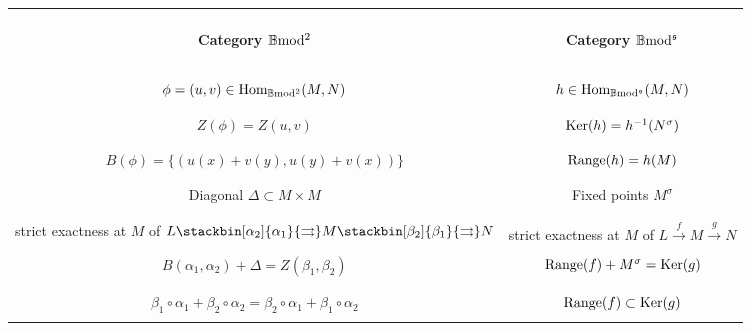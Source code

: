 \documentclass[12pt]{article}
\def\Hom{{\rm Hom}}
\def\Ker{{\rm Ker}}
\def\equ{{\rm Equ}}
\def\coker{{\rm Coker}}
\def\coequ{{\rm Coequ}}
\def\B{{\mathbb B}}
\def\strg{strict }
\def\Hom {{\mbox{Hom}}}
\def\bm2{{\rm \B mod^2}}
\def\b2{{\rm \B mod^{\mathfrak s}}}
\begin{document}
 \begin{table}[H]
\begin{center}
\label{tab:1}       %
%
%
\begin{tabular}{| c | c |}%
\hline
&\\
\begin{Large}{\bf Category $\bm2$}\end{Large} &\begin{Large}\bf{ Category $\b2$}\end{Large} \\ &\\
\hline &\\
$\phi=(u,v)\in \Hom_\bm2(M,N)$ &  $h\in \Hom_\b2(M,N)$\\  &\\
\hline &\\
$Z(\phi)=Z(u,v)$ & $\Ker(h)=h^{-1} (N^\sigma)$ \\
&\\
\hline &\\
$B(\phi)=\{(u(x)+v(y),u(y)+v(x))\}$& ${\rm Range}(h)=h(M)$\\ 
&\\
\hline &\\
Diagonal $\Delta\subset M\times M$ & Fixed points $M^\sigma$\\  & \\ 
\hline &\\
\strg exactness at $M$ of $L \stackbin[\alpha_2]{\alpha_1}{\rightrightarrows}M\stackbin[\beta_2]{\beta_1}{\rightrightarrows}N$& \strg exactness at $M$ of $L\stackrel{f}{\to} M\stackrel{g}{\to}N$\\ &\\$ B(\alpha_1,\alpha_2)+\Delta=Z(\beta_1,\beta_2)$ & ${\rm Range}(f)+M^\sigma=\Ker(g)$\\ &\\
\hline &\\
$\beta_1\circ \alpha_1+\beta_2\circ \alpha_2=\beta_2\circ \alpha_1+\beta_1\circ \alpha_2$ & ${\rm Range}(f)\subset \Ker(g)$\\ &\\
\hline
\end{tabular}
\end{center}
\end{table}
\end{document}
